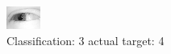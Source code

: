 \begin{figure}[h!]
\begin{center}
\includegraphics[width=0.60\columnwidth]{figures/ID2427_class_3_target_4.png}
\end{center}
\caption{ Classification: 3 actual target: 4}
\label{fig:ID2427_class_3_target_4}
\end{figure}
